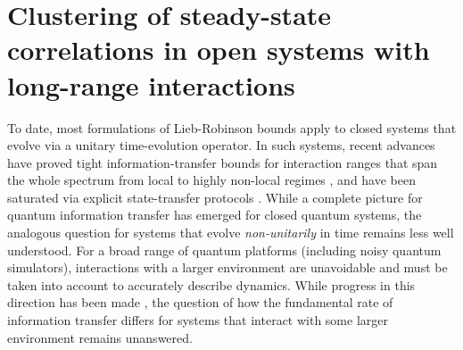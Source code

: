 \chapter{Clustering of steady-state correlations in open systems with long-range interactions}
\label{ch:occ}

To date, most  formulations of Lieb-Robinson bounds apply to closed systems that evolve  via a unitary time-evolution operator.
In such systems, recent advances have proved tight information-transfer bounds for interaction ranges that span the whole spectrum from local \cite{ChenLucas2021graphtheory,WangHazzard2020} to highly non-local regimes \cite{Tran2019a,Chen2019,kuwaharaStrictlyLinearLight2020,Tran2021b}, and have been saturated via explicit state-transfer protocols \cite{Eldredge2017,Tran2020hierarchylinearlightcones,Tran2021a}.
While a complete picture for quantum information transfer has emerged for closed quantum systems,  the analogous question for systems that evolve \textit{non-unitarily} in time remains less well understood.
For a broad range of quantum platforms (including noisy quantum simulators), interactions with a  larger environment are unavoidable and must be taken into account to accurately describe dynamics.
While progress in this direction has been made \cite{poulin2010, descamps2013, cubitt2015, Kastoryano2013, Sweke2019}, the question of how the fundamental rate of information transfer differs for systems that interact with some larger environment remains unanswered.

